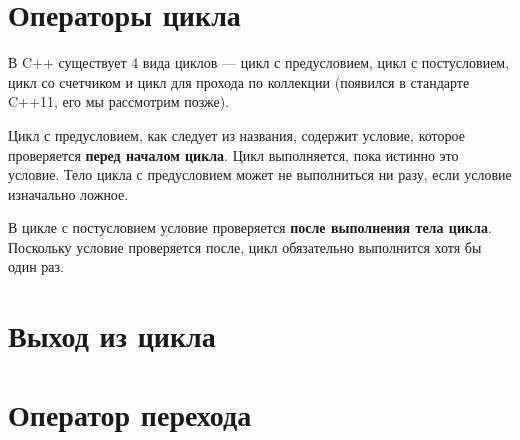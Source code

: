 \documentclass[book.tex]{subfiles}
\begin{document}

\section*{Операторы цикла}


В C++ существует 4 вида циклов --- цикл с предусловием, цикл с постусловием, цикл со счетчиком и цикл для прохода по коллекции (появился в стандарте C++11, его мы рассмотрим позже).

Цикл с предусловием, как следует из названия, содержит условие, которое проверяется \textbf{перед началом цикла}. Цикл выполняется, пока истинно это условие. Тело цикла с предусловием может не выполниться ни разу, если условие изначально ложное.

В цикле с постусловием условие проверяется \textbf{после выполнения тела цикла}. Поскольку условие проверяется после, цикл обязательно выполнится хотя бы один раз.

\section*{Выход из цикла}

\section*{Оператор перехода}
\end{document}
